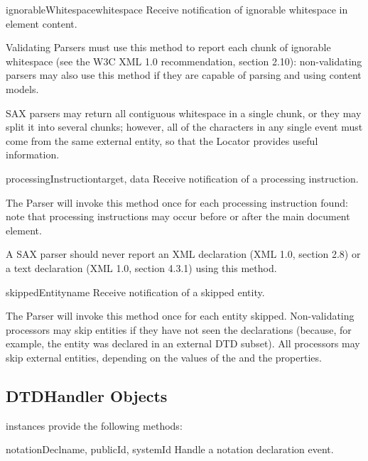 \begin{methoddesc}[ContentHandler]{ignorableWhitespace}{whitespace}
  Receive notification of ignorable whitespace in element content.
        
  Validating Parsers must use this method to report each chunk
  of ignorable whitespace (see the W3C XML 1.0 recommendation,
  section 2.10): non-validating parsers may also use this method
  if they are capable of parsing and using content models.
  
  SAX parsers may return all contiguous whitespace in a single
  chunk, or they may split it into several chunks; however, all
  of the characters in any single event must come from the same
  external entity, so that the Locator provides useful
  information.
\end{methoddesc}

\begin{methoddesc}[ContentHandler]{processingInstruction}{target, data}
  Receive notification of a processing instruction.
        
  The Parser will invoke this method once for each processing
  instruction found: note that processing instructions may occur
  before or after the main document element.

  A SAX parser should never report an XML declaration (XML 1.0,
  section 2.8) or a text declaration (XML 1.0, section 4.3.1) using
  this method.
\end{methoddesc}

\begin{methoddesc}[ContentHandler]{skippedEntity}{name}
  Receive notification of a skipped entity.
        
  The Parser will invoke this method once for each entity
  skipped. Non-validating processors may skip entities if they have
  not seen the declarations (because, for example, the entity was
  declared in an external DTD subset). All processors may skip
  external entities, depending on the values of the
   and the
   properties.
\end{methoddesc}


\subsection{DTDHandler Objects \label{dtd-handler-objects}}

 instances provide the following methods:

\begin{methoddesc}[DTDHandler]{notationDecl}{name, publicId, systemId}
  Handle a notation declaration event.
\end{methoddesc}

